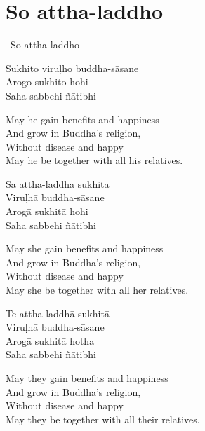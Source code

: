\suttaRef{[AN 5.36]}

\section{So attha-laddho}
\label{so-attha-laddho}

\begin{leader-only}
  \anglebracketleft\ \hspace{-0.5mm}So attha-laddho \hspace{-0.5mm}\anglebracketright\
\end{leader-only}

\vspace{-0.99em}

\begin{pali-hang}
  Sukhito viruḷho buddha-sāsane\\
  Arogo sukhito hohi\\
  Saha sabbehi ñātibhi
\end{pali-hang}

\begin{english-verses}
  May he gain benefits and happiness\\
  And grow in Buddha's religion,\\
  Without disease and happy\\
  May he be together with all his relatives.
\end{english-verses}

\begin{pali-hang}
  Sā attha-laddhā sukhitā\\
  Viruḷhā buddha-sāsane\\
  Arogā sukhitā hohi\\
  Saha sabbehi ñātibhi
\end{pali-hang}

\begin{english-verses}
  May she gain benefits and happiness\\
  And grow in Buddha's religion,\\
  Without disease and happy\\
  May she be together with all her relatives.
\end{english-verses}

\begin{pali-hang}
  Te attha-laddhā sukhitā\\
  Viruḷhā buddha-sāsane\\
  Arogā sukhitā hotha\\
  Saha sabbehi ñātibhi
\end{pali-hang}

\begin{english-verses}
  May they gain benefits and happiness\\
  And grow in Buddha's religion,\\
  Without disease and happy\\
  May they be together with all their relatives.
\end{english-verses}

\suttaRef{[AN 3.155]}

